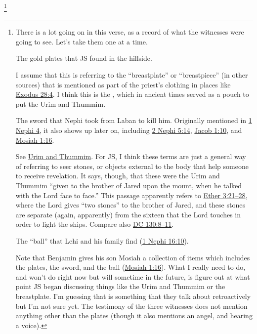 			\footnote{%
				There is a lot going on in this verse, as a record of what the witnesses were going to see. Let's take them one at a time.
					\begin{compactdesc}
						\item[Plates] The gold plates that JS found in the hillside.
						\item[Breastplate] I assume that this is referring to the ``breastplate'' or ``breastpiece'' (in other sources) that is mentioned as part of the priest's clothing in places like \hyperref[EXODUS-28-4]{Exodus 28:4}. I think this is the , which in ancient times served as a pouch to put the Urim and Thummim.
						\item[Sword of Laban] The sword that Nephi took from Laban to kill him. Originally mentioned in \hyperref[1NEPHI-4]{1 Nephi 4}, it also shows up later on, including \hyperref[2NEPHI-5-14]{2 Nephi 5:14}, \hyperref[JACOB-1-10]{Jacob 1:10}, and \hyperref[MOSIAH-1-16]{Mosiah 1:16}.
						\item[Urim and Thummim] See \hyperref[URIMTHUMMIM]{Urim and Thummim}. For JS, I think these terms are just a general way of referring to seer stones, or objects external to the body that help someone to receive revelation. It says, though, that these were the Urim and Thummim ``given to the brother of Jared upon the mount, when he talked with the Lord face to face.'' This passage apparently refers to \hyperref[ETHER-3-21]{Ether 3:21--28}, where the Lord gives ``two stones'' to the brother of Jared, and these stones are separate (again, apparently) from the sixteen that the Lord touches in order to light the ships. Compare also \hyperref[DC130-8]{DC 130:8--11}.
						\item[Directors (Liahona)] The ``ball'' that Lehi and his family find (\hyperref[1NEPHI-16-10]{1 Nephi 16:10}).
					\end{compactdesc}
				Note that Benjamin gives his son Mosiah a collection of items which includes the plates, the sword, and the ball (\hyperref[MOSIAH-1-16]{Mosiah 1:16}).
				What I really need to do, and won't do right now but will sometime in the future, is figure out at what point JS began discussing things like the Urim and Thummim or the breastplate. I'm guessing that is something that they talk about retroactively but I'm not sure yet. The testimony of the three witnesses does not mention anything other than the plates (though it also mentions an angel, and hearing a voice).
				}

